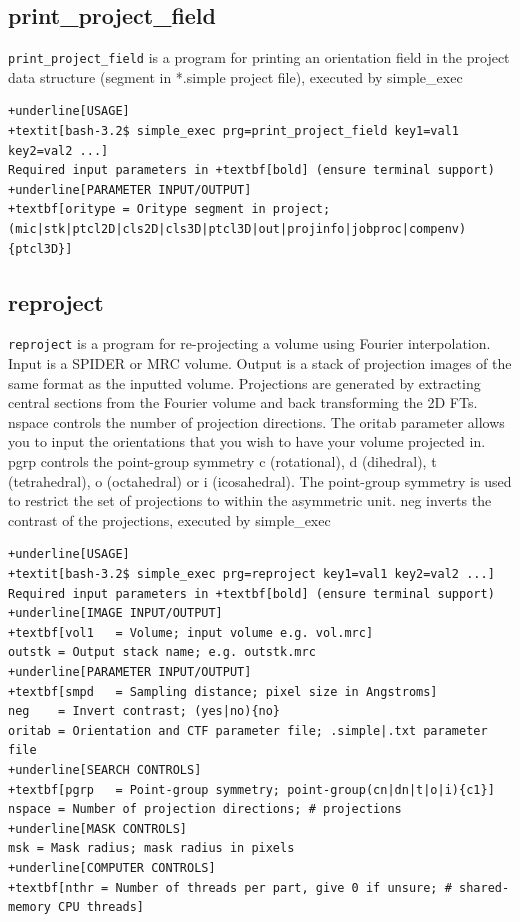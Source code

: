 \documentclass[a4paper,11pt]{article}
\newcommand{\prgname}[1]{\textcolor{NavyBlue}{\texttt{#1}}}
\begin{document}
\subsection{print\_project\_field}
\label{print_project_field}
\prgname{print\_project\_field} is a program for printing an orientation field in the project data structure (segment in *.simple project file), executed by simple\_exec
\begin{Verbatim}[commandchars=+\[\],fontsize=\small,breaklines=true]
+underline[USAGE]
+textit[bash-3.2$ simple_exec prg=print_project_field key1=val1 key2=val2 ...]
Required input parameters in +textbf[bold] (ensure terminal support)
+underline[PARAMETER INPUT/OUTPUT]
+textbf[oritype = Oritype segment in project; (mic|stk|ptcl2D|cls2D|cls3D|ptcl3D|out|projinfo|jobproc|compenv){ptcl3D}]
\end{Verbatim}

\subsection{reproject}
\label{reproject}
\prgname{reproject} is a program for re-projecting a volume using Fourier interpolation. Input is a SPIDER or MRC volume. Output is a stack of projection images of the same format as the inputted volume. Projections are generated by extracting central sections from the Fourier volume and back transforming the 2D FTs. nspace controls the number of projection directions. The oritab parameter allows you to input the orientations that you wish to have your volume projected in. pgrp controls the point-group symmetry c (rotational), d (dihedral), t (tetrahedral), o (octahedral) or i (icosahedral). The point-group symmetry is used to restrict the set of projections to within the asymmetric unit. neg inverts the contrast of the projections, executed by simple\_exec
\begin{Verbatim}[commandchars=+\[\],fontsize=\small,breaklines=true]
+underline[USAGE]
+textit[bash-3.2$ simple_exec prg=reproject key1=val1 key2=val2 ...]
Required input parameters in +textbf[bold] (ensure terminal support)
+underline[IMAGE INPUT/OUTPUT]
+textbf[vol1   = Volume; input volume e.g. vol.mrc]
outstk = Output stack name; e.g. outstk.mrc
+underline[PARAMETER INPUT/OUTPUT]
+textbf[smpd   = Sampling distance; pixel size in Angstroms]
neg    = Invert contrast; (yes|no){no}
oritab = Orientation and CTF parameter file; .simple|.txt parameter file
+underline[SEARCH CONTROLS]
+textbf[pgrp   = Point-group symmetry; point-group(cn|dn|t|o|i){c1}]
nspace = Number of projection directions; # projections
+underline[MASK CONTROLS]
msk = Mask radius; mask radius in pixels
+underline[COMPUTER CONTROLS]
+textbf[nthr = Number of threads per part, give 0 if unsure; # shared-memory CPU threads]
\end{Verbatim}
\end{document}
